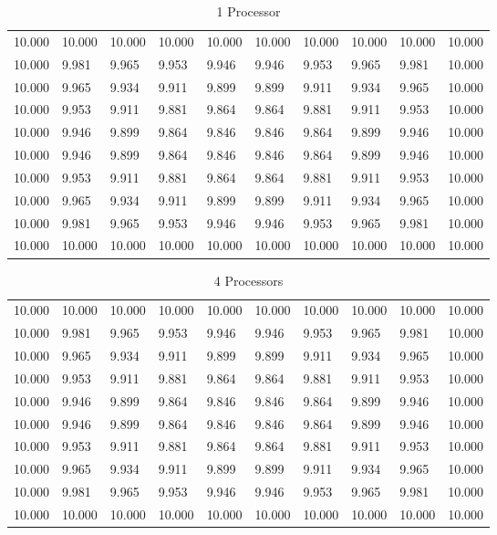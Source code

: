 \documentclass{article}
\begin{document}
\begin{table}[]
\caption{1 Processor}
\begin{tabular}{llllllllll}
10.000 & 10.000 & 10.000 & 10.000 & 10.000 & 10.000 & 10.000 & 10.000 & 10.000 & 10.000 \\
10.000 & 9.981  & 9.965  & 9.953  & 9.946  & 9.946  & 9.953  & 9.965  & 9.981  & 10.000 \\
10.000 & 9.965  & 9.934  & 9.911  & 9.899  & 9.899  & 9.911  & 9.934  & 9.965  & 10.000 \\
10.000 & 9.953  & 9.911  & 9.881  & 9.864  & 9.864  & 9.881  & 9.911  & 9.953  & 10.000 \\
10.000 & 9.946  & 9.899  & 9.864  & 9.846  & 9.846  & 9.864  & 9.899  & 9.946  & 10.000 \\
10.000 & 9.946  & 9.899  & 9.864  & 9.846  & 9.846  & 9.864  & 9.899  & 9.946  & 10.000 \\
10.000 & 9.953  & 9.911  & 9.881  & 9.864  & 9.864  & 9.881  & 9.911  & 9.953  & 10.000 \\
10.000 & 9.965  & 9.934  & 9.911  & 9.899  & 9.899  & 9.911  & 9.934  & 9.965  & 10.000 \\
10.000 & 9.981  & 9.965  & 9.953  & 9.946  & 9.946  & 9.953  & 9.965  & 9.981  & 10.000 \\
10.000 & 10.000 & 10.000 & 10.000 & 10.000 & 10.000 & 10.000 & 10.000 & 10.000 & 10.000 \\
\end{tabular}
\end{table}

\begin{table}[]
\centering
\caption{4 Processors}
\begin{tabular}{llllllllll}
10.000 & 10.000 & 10.000 & 10.000 & 10.000 & 10.000 & 10.000 & 10.000 & 10.000 & 10.000 \\
10.000 & 9.981  & 9.965  & 9.953  & 9.946  & 9.946  & 9.953  & 9.965  & 9.981  & 10.000 \\
10.000 & 9.965  & 9.934  & 9.911  & 9.899  & 9.899  & 9.911  & 9.934  & 9.965  & 10.000 \\
10.000 & 9.953  & 9.911  & 9.881  & 9.864  & 9.864  & 9.881  & 9.911  & 9.953  & 10.000 \\
10.000 & 9.946  & 9.899  & 9.864  & 9.846  & 9.846  & 9.864  & 9.899  & 9.946  & 10.000 \\
10.000 & 9.946  & 9.899  & 9.864  & 9.846  & 9.846  & 9.864  & 9.899  & 9.946  & 10.000 \\
10.000 & 9.953  & 9.911  & 9.881  & 9.864  & 9.864  & 9.881  & 9.911  & 9.953  & 10.000 \\
10.000 & 9.965  & 9.934  & 9.911  & 9.899  & 9.899  & 9.911  & 9.934  & 9.965  & 10.000 \\
10.000 & 9.981  & 9.965  & 9.953  & 9.946  & 9.946  & 9.953  & 9.965  & 9.981  & 10.000 \\
10.000 & 10.000 & 10.000 & 10.000 & 10.000 & 10.000 & 10.000 & 10.000 & 10.000 & 10.000
\end{tabular}
\end{table}
\end{document}
